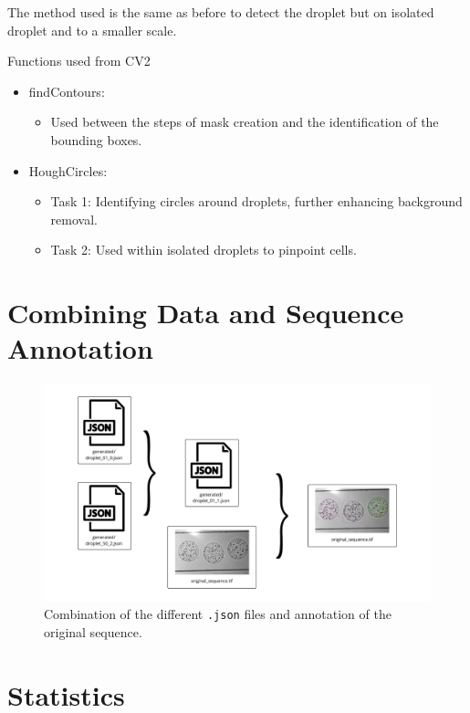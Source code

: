 \documentclass[12pt]{beamer}
\begin{document}
\begin{frame}[t]
\begin{multicols}{3}
    The method used is the same as before to detect the droplet but on isolated droplet and to a smaller scale.

\vspace{0.25cm}

\begin{alertblock}{Functions used from CV2 \cite{cv2}}
\begin{itemize}
\item findContours:
\begin{itemize}
\item Used between the steps of mask creation and the identification of the bounding boxes.
\end{itemize}
\item HoughCircles:
\begin{itemize}
    \item Task 1: Identifying circles around droplets, further enhancing background removal.
    \item Task 2: Used within isolated droplets to pinpoint cells.
    \end{itemize}
\end{itemize}    
    
    
\end{alertblock}

\section{Combining Data and Sequence Annotation}
    \begin{figure}[H]
        \centering
        \includegraphics[width=.9\linewidth]{figs/section4.png}
        \caption{Combination of the different \texttt{.json} files and annotation of the original sequence.}
        \label{fig:annotate}
    \end{figure}
\columnbreak 
\section{Statistics}


\end{multicols}
\end{frame}
\end{document}
